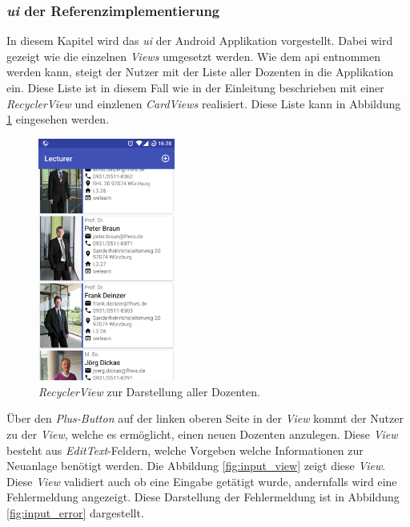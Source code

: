 \subsubsection{\textit{\acf{ui}} der Referenzimplementierung}
In diesem Kapitel wird das \textit{\acl{ui}} der Android Applikation vorgestellt. Dabei wird gezeigt wie die einzelnen \textit{Views} umgesetzt werden.
Wie dem \acl{api} entnommen werden kann, steigt der Nutzer mit der Liste aller Dozenten in die Applikation ein. Diese Liste ist in diesem Fall wie in der Einleitung beschrieben mit einer \textit{RecyclerView} und einzlenen \textit{CardViews} realisiert. Diese Liste kann in Abbildung \ref{fig:list} eingesehen werden.

\begin{figure}[H]
	\begin{center}
		\includegraphics[width=0.4\textwidth]{images/list.png}
		\caption{\textit{RecyclerView} zur Darstellung aller Dozenten.}
		\label{fig:list}
	\end{center}
\end{figure}

Über den \textit{Plus-Button} auf der linken oberen Seite in der \textit{View} kommt der Nutzer zu der \textit{View}, welche es ermöglicht, einen neuen Dozenten anzulegen. Diese \textit{View} besteht aus \textit{EditText}-Feldern, welche Vorgeben welche Informationen zur Neuanlage benötigt werden. Die Abbildung \ref{fig:input_view} zeigt diese \textit{View}. Diese \textit{View} validiert auch ob eine Eingabe getätigt wurde, andernfalls wird eine Fehlermeldung angezeigt. Diese Darstellung der Fehlermeldung ist in Abbildung \ref{fig:input_error} dargestellt.

